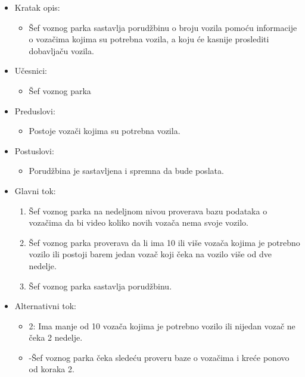 \begin{itemize}
	\item Kratak opis:
		\begin{itemize}
			\item Šef voznog parka sastavlja porudžbinu o broju vozila pomoću informacije o vozačima kojima su potrebna vozila, a koju će kasnije proslediti dobavljaču vozila.		
		\end{itemize}

	\item Učesnici:
		\begin{itemize}
		    \item Šef voznog parka
		\end{itemize}


	\item Preduslovi:
		\begin{itemize}
		    \item Postoje vozači kojima su potrebna vozila.
		\end{itemize}


	\item Postuslovi:
		\begin{itemize}
			\item Porudžbina je sastavljena i spremna da bude poslata.
	\end{itemize}

	\item Glavni tok:
		\begin{enumerate}
		    \item Šef voznog parka na nedeljnom nivou proverava bazu podataka o vozačima da bi video koliko novih vozača nema svoje vozilo.
		    \item Šef voznog parka proverava da li ima 10 ili više vozača kojima je potrebno vozilo ili postoji barem jedan vozač koji čeka na vozilo više od dve nedelje.
		    \item Šef voznog parka sastavlja porudžbinu.
		\end{enumerate}

	\item Alternativni tok:
		\begin{itemize}
		    \item 2: Ima manje od 10 vozača kojima je potrebno vozilo ili nijedan vozač ne čeka 2 nedelje.
			\item -Šef voznog parka čeka sledeću proveru baze o vozačima i kreće ponovo od koraka 2.
		\end{itemize}

\end{itemize}

